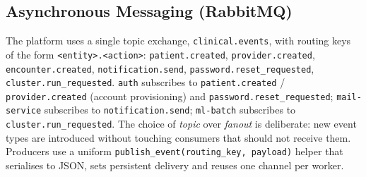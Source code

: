 \subsection{Asynchronous Messaging (RabbitMQ)}

The platform uses a single topic exchange, \texttt{clinical.events}, with routing keys of the form \texttt{<entity>.<action>}: \texttt{patient.created}, \texttt{provider.created}, \texttt{encounter.created}, \texttt{notification.send}, \texttt{password.reset\_requested}, \texttt{cluster.run\_requested}. \texttt{auth} subscribes to \texttt{patient.created} / \texttt{provider.created} (account provisioning) and \texttt{password.reset\_requested}; \texttt{mail-service} subscribes to \texttt{notification.send}; \texttt{ml-batch} subscribes to \texttt{cluster.run\_requested}. The choice of \emph{topic} over \emph{fanout} is deliberate: new event types are introduced without touching consumers that should not receive them. Producers use a uniform \texttt{publish\_event(routing\_key, payload)} helper that serialises to JSON, sets persistent delivery and reuses one channel per worker.
